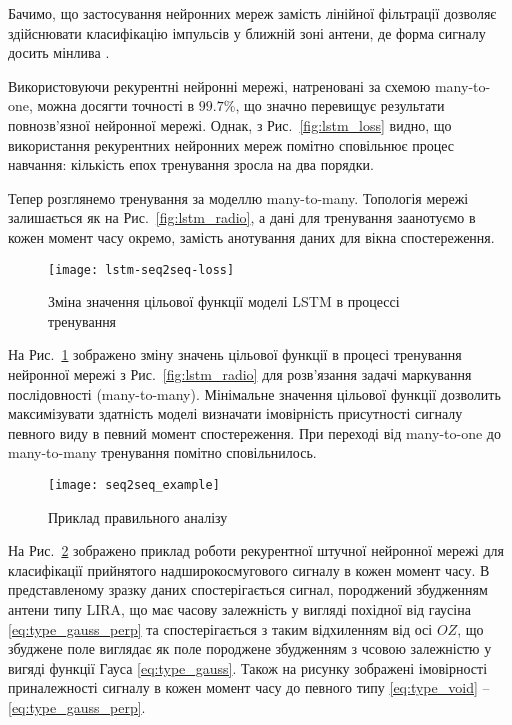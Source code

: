 Бачимо, що застосування нейронних мереж замість лінійної фільтрації 
дозволяє здійснювати класифікацію імпульсів у ближній зоні антени, де 
форма сигналу досить мінлива \cite{my:UWBUSIS2018}.

Використовуючи рекурентні нейронні мережі, натреновані за схемою many-to-one, 
можна досягти точності в $ 99.7\% $, що значно перевищує результати 
повнозв'язної нейронної мережі. Однак, з Рис.~\ref{fig:lstm_loss} видно, що 
використання рекурентних нейронних мереж помітно сповільнює процес навчання: 
кількість епох тренування зросла на два порядки.

Тепер розглянемо тренування за моделлю many-to-many. Топологія мережі 
залишається як на Рис.~\ref{fig:lstm_radio}, а дані для тренування
заанотуємо в кожен момент часу окремо, замість анотування даних для вікна 
спостереження.

\begin{figure}[htbp] \begin{center}
\texttt{[image: lstm-seq2seq-loss]}
\caption{Зміна значення цільової функції моделі LSTM
в процессі тренування} \label{fig:lstm_seq2seq_loss}
\end{center} \end{figure}

На Рис.~\ref{fig:lstm_seq2seq_loss} зображено зміну значень цільової функції
в процесі тренування нейронної мережі з Рис.~\ref{fig:lstm_radio} для 
розв'язання задачі маркування послідовності (many-to-many). Мінімальне значення 
цільової функції дозволить максимізувати здатність моделі визначати
імовірність присутності сигналу певного виду в певний момент спостереження.
При переході від many-to-one до many-to-many тренування помітно сповільнилось.

\begin{figure}[htbp] \begin{center}
\texttt{[image: seq2seq\_example]}
\caption{Приклад правильного аналізу} \label{fig:seq2seq_example}
\end{center} \end{figure}

На Рис.~\ref{fig:seq2seq_example} зображено приклад роботи рекурентної 
штучної нейронної мережі для класифікації прийнятого надширокосмугового сигналу 
в кожен момент часу. В представленому зразку даних спостерігається сигнал,
породжений збудженням антени типу LIRA, що має часову залежність у вигляді 
похідної від гаусіна \eqref{eq:type_gauss_perp} та спостерігається з 
таким відхиленням від осі $ OZ $, що збуджене поле виглядає як поле породжене 
збудженням з чсовою залежністю у вигяді функції Гауса \eqref{eq:type_gauss}. 
Також на рисунку зображені імовірності приналежності сигналу в кожен момент 
часу до певного типу \eqref{eq:type_void} -- \eqref{eq:type_gauss_perp}.

